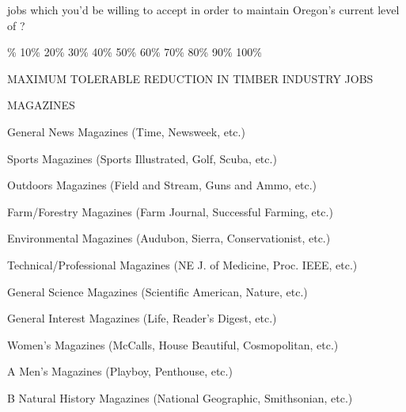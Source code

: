 jobs which you'd be willing to accept in order to maintain Oregon's current
level of ?
\medskip\par{}\% \hfill 10\% \hfill 20\% \hfill 30\% \hfill 40\% \hfill 50\% \hfill 60\% \hfill 
70\% \hfill 80\% \hfill 90\% \hfill 100\%
\medskip\par\noindent
\centerline{MAXIMUM TOLERABLE REDUCTION IN TIMBER INDUSTRY JOBS}
\bigskip\bigskip\par\noindent
\vfill\eject
\centerline{\twlbf MAGAZINES}
\bigskip\bigskip\par\noindent
{}
\medskip\par\noindent
{}
\hbox{\vrule height 0.4pt width 0.5in} General News Magazines (Time, 
Newsweek, etc.)
\medskip\par\noindent
{}
\hbox{\vrule height 0.4pt width 0.5in} Sports Magazines (Sports 
Illustrated, Golf, Scuba, etc.)
\medskip\par\noindent
{}
\hbox{\vrule height 0.4pt width 0.5in} Outdoors Magazines (Field and 
Stream, Guns and Ammo, etc.)
\medskip\par\noindent
{}
\hbox{\vrule height 0.4pt width 0.5in} Farm/Forestry Magazines (Farm Journal,
Successful Farming, etc.)
\medskip\par\noindent
{}
\hbox{\vrule height 0.4pt width 0.5in} Environmental 
Magazines (Audubon, Sierra, Conservationist, etc.)
\medskip\par\noindent
{}
\hbox{\vrule height 0.4pt width 0.5in} Technical/Professional Magazines
(NE J. of Medicine, Proc. IEEE, etc.)
\medskip\par\noindent
{}
\hbox{\vrule height 0.4pt width 0.5in} General Science Magazines 
(Scientific American, Nature, etc.)
\medskip\par\noindent
{}
\hbox{\vrule height 0.4pt width 0.5in} General Interest Magazines 
(Life, Reader's Digest, etc.)
\medskip\par\noindent
{}
\hbox{\vrule height 0.4pt width 0.5in} Women's Magazines 
(McCalls, House Beautiful, Cosmopolitan, etc.)
\medskip\par\noindent
{\fiverm A}
\hbox{\vrule height 0.4pt width 0.5in} Men's Magazines 
(Playboy, Penthouse, etc.)
\medskip\par\noindent
{\fiverm B}
\hbox{\vrule height 0.4pt width 0.5in} Natural History Magazines 
(National Geographic, Smithsonian, etc.)
